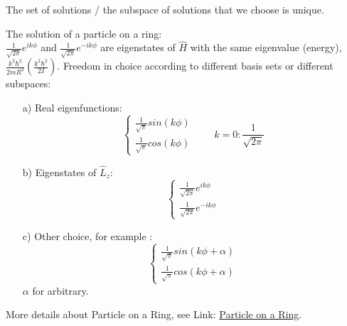 \documentclass[a4paper, 12pt]{article}
\begin{document}
The set of solutions / the subspace of solutions that we choose is unique. 
\begin{summary}{}{}
The solution of a particle on a ring: \\
\indent $\frac{1}{\sqrt{2\pi}}e^{ik\phi}$ and $\frac{1}{\sqrt{2\pi}}e^{-ik\phi}$ are eigenstates of $\hat{H}$ with the same eigenvalue (energy), $\frac{k^2 \hbar^2}{2mR^2} (\frac{k^2 \hbar^2}{2I})$.
Freedom in choice according to different basis sets or different subspaces: 
\begin{itemize}
	\item [a)] Real eigenfunctions:
 $$  \left\{ \begin{aligned}
        \frac{1}{\sqrt{\pi}} sin (k\phi)\\ \frac{1}{\sqrt{\pi}}  cos (k\phi) 
            \end{aligned}\right. \qquad k=0: \frac{1}{\sqrt{2\pi}} $$
	\item [b)] Eigenstates of $\hat{L}_z$:
$$  \left\{ \begin{aligned}
        \frac{1}{\sqrt{2\pi}}e^{ik\phi}\\ \frac{1}{\sqrt{2\pi}}e^{-ik\phi}
            \end{aligned}\right.  $$
	\item [c)] Other choice, for example	:
 $$  \left\{ \begin{aligned}
        \frac{1}{\sqrt{\pi}} sin (k\phi + \alpha )\\ \frac{1}{\sqrt{\pi}}  cos (k\phi+ \alpha) 
            \end{aligned}\right. $$
            $\alpha$ for arbitrary.
\end{itemize}   
\end{summary}



More details about Particle on a Ring, see Link:  \href{http://scienide2.uwaterloo.ca/~nooijen/Chem356/particle_on_the_ring.pdf}{Particle on a Ring}. 
\end{document}
